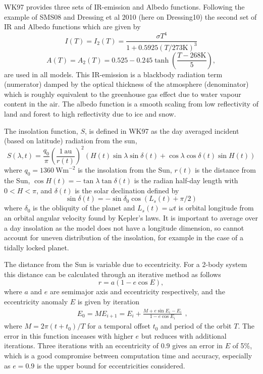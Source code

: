 \documentclass[12pt, onecolumn]{revtex4-2}    %
\begin{document}
WK97 provides three sets of IR-emission and Albedo functions. Following the example of SMS08 and Dressing et al 2010 (here on Dressing10) \cite{Dressing10} the second set of IR and Albedo functions which are given by
\begin{equation}
  I(T) = I_2(T) = \frac{\sigma T^4}{1 + 0.5925 (T / 273 \text{K}) ^ 3}
\end{equation}
\begin{equation}
  A(T) = A_2(T) = 0.525 - 0.245 \tanh\left(\frac{T - 268 \text{K}}{5}\right),
\end{equation}
are used in all models.
This IR-emission is a blackbody radiation term (numerator) damped by the optical thickness of the atmosphere (denominator) which is roughly equivalent to the greenhouse gas effect due to water vapour content in the air.
The albedo function is a smooth scaling from low reflectivity of land and forest to high reflectivity due to ice and snow.

The insolation function, $S$, is defined in WK97 as the day averaged incident (based on latitude) radiation from the sun,
$$
  S(\lambda, t) = \frac{q_0}{\pi} \left(\frac{1 \ \text{au}}{r(t)}\right)^2 (H(t) \sin{\lambda} \sin{\delta(t)} + \cos{\lambda} \cos{\delta(t)} \sin{H(t)})
$$
where $q_0=1360 \ \text{Wm}^{-2}$ is the insolation from the Sun,
$r(t)$ is the distance from the Sun,
$\cos H(t) = -\tan \lambda \tan \delta(t)$ is the radian half-day length with $0 < H < \pi$,
and $\delta(t)$ is the solar declination defined by
$$
  \sin \delta(t) = -\sin \delta_0 \cos(L_s(t) + \pi/2)
$$
where $\delta_0$ is the obliquity of the planet and $L_s(t) = \omega t$ is orbital longitude from an orbital angular velocity found by Kepler's laws.
It is important to average over a day insolation as the model does not have a longitude dimension, so cannot account for uneven distribution of the insolation, for example in the case of a tidally locked planet.

The distance from the Sun is variable due to eccentricity.
For a 2-body system this distance can be calculated through an iterative method as follows
\begin{equation}
  r = a (1 - e \cos E), \label{eq:two_body_distance}
\end{equation}
where $a$ and $e$ are semimajor axis and eccentricity respectively, and the eccentricity anomaly $E$ is given by iteration
\begin{equation}
  \begin{split}
    E_0 = M
    E_{i+1} = E_i + \frac{M + e \sin E_i - E_i}{1-e \cos E_i}
  \end{split},
  \label{eq:two_body_angle}
\end{equation}
where $M = 2\pi (t + t_0) / T$ for a temporal offset $t_0$ and period of the orbit $T$.
The error in this function inceases with higher $e$ but reduces with additional iterations.
Three iterations with an eccentricity of $0.9$ gives an error in $E$ of 5\%, which is a good compromise between computation time and accuracy, especially as $e=0.9$ is the upper bound for eccentricities considered.
\end{document}

